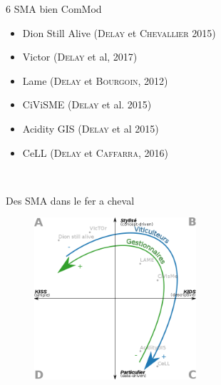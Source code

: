 \documentclass[newPxFont]{beamer}
\begin{document}
\begin{frame}[c]{6 SMA bien ComMod}
  \vspace{-2em}
  \begin{itemize}
    \item Dion Still Alive {\color{lightgray}(\textsc{Delay} et \textsc{Chevallier} 2015)}
    \item Victor {\color{lightgray}(\textsc{Delay} et al, 2017)}
    \item Lame {\color{lightgray}(\textsc{Delay} et \textsc{Bourgoin}, 2012)}
    \item CiViSME {\color{lightgray}(\textsc{Delay} et al. 2015)}
    \item Acidity GIS {\color{lightgray}(\textsc{Delay} et al 2015)}
    \item CeLL {\color{lightgray}(\textsc{Delay} et \textsc{Caffarra}, 2016)}
  \end{itemize}
  \vspace{-2em}
  \begin{figure}
    \\ %
  \end{figure}
\end{frame}

\begin{frame}[c]{Des SMA dans le fer a cheval}
  \vspace{-2em}
  \begin{figure}
   \includegraphics[height=6cm]{img/a_banos_sanders_positionnements.png}
  \end{figure}
\end{frame}
\end{document}

